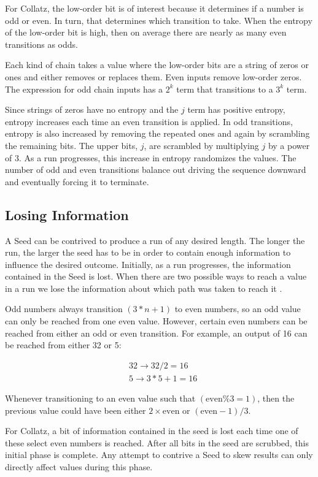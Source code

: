 \documentclass[letterpaper]{article}
\begin{document}
\begin{multicols}{2}
For Collatz, the low-order bit is of interest because it determines if a number is odd or even. In turn, that determines which transition to take. When the entropy of the low-order bit is high, then on average there are nearly as many even transitions as odds.

Each kind of chain takes a value where the low-order bits are a string of zeros or ones and either removes or replaces them. Even inputs remove low-order zeros. The expression for odd chain inputs has a $2^k$ term that transitions to a $3^k$ term.

Since strings of zeros have no entropy and the $j$ term has positive entropy, entropy increases each time an even transition is applied. In odd transitions, entropy is also increased by removing the repeated ones and again by scrambling the remaining bits. The upper bits, $j$, are scrambled by multiplying $j$ by a power of 3. As a run progresses, this increase in entropy randomizes the values. The number of odd and even transitions balance out driving the sequence downward and eventually forcing it to terminate.

\subsection{Losing Information}
A Seed can be contrived to produce a run of any desired length. The longer the run, the larger the seed has to be in order to contain enough information to influence the desired outcome. Initially, as a run progresses, the information contained in the Seed is lost. When there are two possible ways to reach a value in a run we lose the information about which path was taken to reach it \cite{2}.

Odd numbers always transition $(3*n + 1)$ to even numbers, so an odd value can only be reached from one even value. However, certain even numbers can be reached from either an odd or even transition. For example, an output of 16 can be reached from either 32 or 5:

\[
\begin{aligned}
    &32 \rightarrow 32 / 2 = 16 \\
    &5 \rightarrow 3*5 + 1 = 16
\end{aligned}
\]

Whenever transitioning to an even value such that $(\text{even} \% 3 = 1)$, then the previous value could have been either $2 \times \text{even}$ or $(\text{even} - 1) / 3$.

For Collatz, a bit of information contained in the seed is lost each time one of these select even numbers is reached. After all bits in the seed are scrubbed, this initial phase is complete. Any attempt to contrive a Seed to skew results can only directly affect values during this phase.


\end{multicols}
\end{document}
